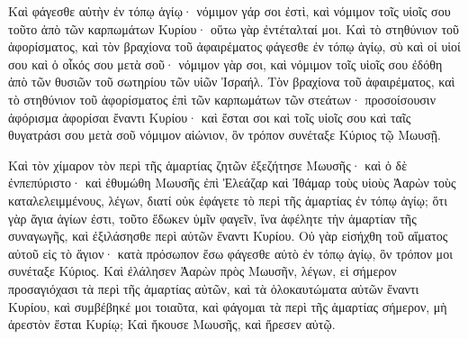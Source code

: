 {Καὶ φάγεσθε αὐτὴν ἐν τόπῳ ἁγίῳ· νόμιμον γάρ σοι ἐστὶ, καὶ νόμιμον τοῖς υἱοῖς σου τοῦτο ἀπὸ τῶν καρπωμάτων Κυρίου· οὕτω γὰρ ἐντέταλταί μοι.
Καὶ τὸ στηθύνιον τοῦ ἀφορίσματος, καὶ τὸν βραχίονα τοῦ ἀφαιρέματος φάγεσθε ἐν τόπῳ ἁγίῳ, σὺ καὶ οἱ υἱοί σου καὶ ὁ οἶκός σου μετὰ σοῦ· νόμιμον γὰρ σοι, καὶ νόμιμον τοῖς υἱοῖς σου ἐδόθη ἀπὸ τῶν θυσιῶν τοῦ σωτηρίου τῶν υἱῶν Ἰσραήλ.
Τὸν βραχίονα τοῦ ἀφαιρέματος, καὶ τὸ στηθύνιον τοῦ ἀφορίσματος ἐπὶ τῶν καρπωμάτων τῶν στεάτων· προσοίσουσιν ἀφόρισμα ἀφορίσαι ἔναντι Κυρίου· καὶ ἔσται σοι καὶ τοῖς υἱοῖς σου καὶ ταῖς θυγατράσι σου μετὰ σοῦ νόμιμον αἰώνιον, ὃν τρόπον συνέταξε Κύριος τῷ Μωυσῇ.
\par }{\PP {}Καὶ τὸν χίμαρον τὸν περὶ τῆς ἁμαρτίας ζητῶν ἐξεζήτησε Μωυσῆς· καὶ ὁ δὲ ἐνπεπύριστο· καὶ ἐθυμώθη Μωυσῆς ἐπὶ Ἐλεάζαρ καὶ Ἰθάμαρ τοὺς υἱοὺς Ἀαρὼν τοὺς καταλελειμμένους, λέγων,
διατί οὐκ ἐφάγετε τὸ περὶ τῆς ἁμαρτίας ἐν τόπῳ ἁγίῳ; ὅτι γὰρ ἅγια ἁγίων ἐστι, τοῦτο ἔδωκεν ὑμῖν φαγεῖν, ἵνα ἀφέλητε τὴν ἁμαρτίαν τῆς συναγωγῆς, καὶ ἐξιλάσησθε περὶ αὐτῶν ἔναντι Κυρίου.
Οὐ γὰρ εἰσήχθη τοῦ αἵματος αὐτοῦ εἰς τὸ ἅγιον· κατὰ πρόσωπον ἔσω φάγεσθε αὐτὸ ἐν τόπῳ ἁγίῳ, ὃν τρόπον μοι συνέταξε Κύριος.
Καὶ ἐλάλησεν Ἀαρὼν πρὸς Μωυσῆν, λέγων, εἰ σήμερον προσαγιόχασι τὰ περὶ τῆς ἁμαρτίας αὐτῶν, καὶ τὰ ὁλοκαυτώματα αὐτῶν ἔναντι Κυρίου, καὶ συμβέβηκέ μοι τοιαῦτα, καὶ φάγομαι τὰ περὶ τῆς ἁμαρτίας σήμερον, μὴ ἀρεστὸν ἔσται Κυρίῳ;
Καὶ ἤκουσε Μωυσῆς, καὶ ἤρεσεν αὐτῷ.

}
